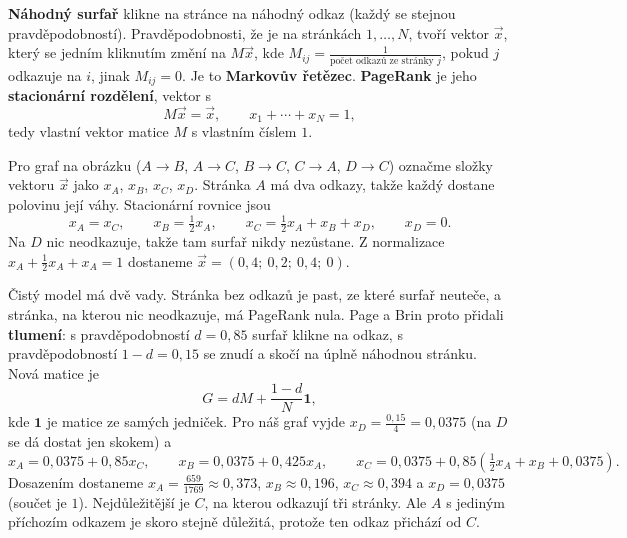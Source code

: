 \begin{definitionbox}
  \textbf{Náhodný surfař} klikne na stránce na náhodný odkaz (každý se stejnou pravděpodobností). Pravděpodobnosti, že je na stránkách $1, \dots, N$, tvoří vektor $\vec{x}$, který se jedním kliknutím změní na $M\vec{x}$, kde $M_{ij} = \frac{1}{\text{počet odkazů ze stránky }j}$, pokud $j$ odkazuje na $i$, jinak $M_{ij} = 0$. Je to \textbf{Markovův řetězec}. \textbf{PageRank} je jeho \textbf{stacionární rozdělení}, vektor s
  \begin{equation*}
    M\vec{x} = \vec{x},\qquad x_1 + \cdots + x_N = 1,
  \end{equation*}
  tedy vlastní vektor matice $M$ s vlastním číslem $1$.
\end{definitionbox}

\begin{example}
  Pro graf na obrázku ($A\to B$, $A\to C$, $B\to C$, $C\to A$, $D\to C$) označme složky vektoru $\vec{x}$ jako $x_A$, $x_B$, $x_C$, $x_D$. Stránka $A$ má dva odkazy, takže každý dostane polovinu její váhy. Stacionární rovnice jsou
  \begin{equation*}
    x_A = x_C,\qquad x_B = \tfrac{1}{2}x_A,\qquad x_C = \tfrac{1}{2}x_A + x_B + x_D,\qquad x_D = 0.
  \end{equation*}
  Na $D$ nic neodkazuje, takže tam surfař nikdy nezůstane. Z normalizace $x_A + \frac{1}{2}x_A + x_A = 1$ dostaneme $\vec{x} = (0{,}4;\ 0{,}2;\ 0{,}4;\ 0)$.
\end{example}

Čistý model má dvě vady. Stránka bez odkazů je past, ze které surfař neuteče, a stránka, na kterou nic neodkazuje, má PageRank nula. Page a Brin proto přidali \textbf{tlumení}: s pravděpodobností $d = 0{,}85$ surfař klikne na odkaz, s pravděpodobností $1 - d = 0{,}15$ se znudí a skočí na úplně náhodnou stránku. Nová matice je
\begin{equation*}
  G = dM + \frac{1 - d}{N}\mathbf{1},
\end{equation*}
kde $\mathbf{1}$ je matice ze samých jedniček. Pro náš graf vyjde $x_D = \frac{0{,}15}{4} = 0{,}0375$ (na $D$ se dá dostat jen skokem) a
\begin{equation*}
  x_A = 0{,}0375 + 0{,}85x_C,\qquad x_B = 0{,}0375 + 0{,}425x_A,\qquad x_C = 0{,}0375 + 0{,}85\left(\tfrac{1}{2}x_A + x_B + 0{,}0375\right).
\end{equation*}
Dosazením dostaneme $x_A = \frac{659}{1769}\approx 0{,}373$, $x_B\approx 0{,}196$, $x_C\approx 0{,}394$ a $x_D = 0{,}0375$ (součet je $1$). Nejdůležitější je $C$, na kterou odkazují tři stránky. Ale $A$ s jediným příchozím odkazem je skoro stejně důležitá, protože ten odkaz přichází od $C$.

